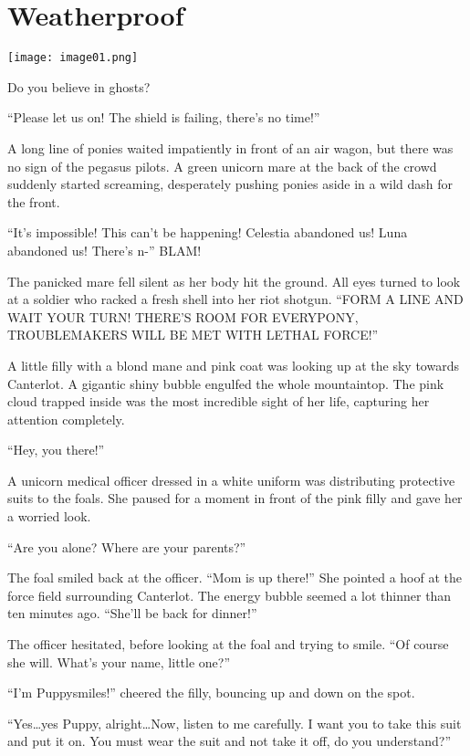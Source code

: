 \chapter{Weatherproof}

\texttt{[image: image01.png]}

\begin{intro}
Do you believe in ghosts?
\end{intro}

``Please let us on! The shield is failing, there's no time!''

A long line of ponies waited impatiently in front of an air wagon, but there was no sign of the pegasus pilots. A green unicorn mare at the back of the crowd suddenly started screaming, desperately pushing ponies aside in a wild dash for the front.

``It's impossible! This can't be happening! Celestia abandoned us! Luna abandoned us! There's n-'' BLAM!

The panicked mare fell silent as her body hit the ground. All eyes turned to look at a soldier who racked a fresh shell into her riot shotgun. ``FORM A LINE AND WAIT YOUR TURN! THERE'S ROOM FOR EVERYPONY, TROUBLEMAKERS WILL BE MET WITH LETHAL FORCE!''

A little filly with a blond mane and pink coat was looking up at the sky towards Canterlot. A gigantic shiny bubble engulfed the whole mountaintop. The pink cloud trapped inside was the most incredible sight of her life, capturing her attention completely.

``Hey, you there!''

A unicorn medical officer dressed in a white uniform was distributing protective suits to the foals. She paused for a moment in front of the pink filly and gave her a worried look.

``Are you alone? Where are your parents?''

The foal smiled back at the officer. ``Mom is up there!'' She pointed a hoof at the force field surrounding Canterlot. The energy bubble seemed a lot thinner than ten minutes ago. ``She'll be back for dinner!''

The officer hesitated, before looking at the foal and trying to smile. ``Of course she will. What's your name, little one?''

``I'm Puppysmiles!'' cheered the filly, bouncing up and down on the spot.

``Yes\dots yes Puppy, alright\dots Now, listen to me carefully. I want you to take this suit and put it on. You must wear the suit and not take it off, do you understand?''


